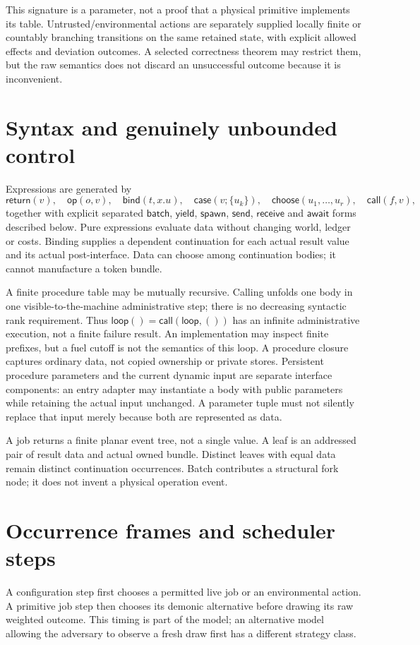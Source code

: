 \documentclass[11pt]{article}
\begin{document}
This signature is a parameter, not a proof that a physical primitive implements its table. Untrusted/environmental actions are separately supplied locally finite or countably branching transitions on the same retained state, with explicit allowed effects and deviation outcomes. A selected correctness theorem may restrict them, but the raw semantics does not discard an unsuccessful outcome because it is inconvenient.

\section{Syntax and genuinely unbounded control}
Expressions are generated by
\[
 \mathsf{return}(v),\quad\mathsf{op}(o,v),\quad
 \mathsf{bind}(t,x.u),\quad\mathsf{case}(v;\{u_k\}),\quad
 \mathsf{choose}(u_1,\ldots,u_r),\quad\mathsf{call}(f,v),
\]
together with explicit separated $\mathsf{batch}$, $\mathsf{yield}$, $\mathsf{spawn}$, $\mathsf{send}$, $\mathsf{receive}$ and $\mathsf{await}$ forms described below. Pure expressions evaluate data without changing world, ledger or costs. Binding supplies a dependent continuation for each actual result value and its actual post-interface. Data can choose among continuation bodies; it cannot manufacture a token bundle.

A finite procedure table may be mutually recursive. Calling unfolds one body in one visible-to-the-machine administrative step; there is no decreasing syntactic rank requirement. Thus $\mathsf{loop}()=\mathsf{call}(\mathsf{loop},())$ has an infinite administrative execution, not a finite failure result. An implementation may inspect finite prefixes, but a fuel cutoff is not the semantics of this loop. A procedure closure captures ordinary data, not copied ownership or private stores. Persistent procedure parameters and the current dynamic input are separate interface components: an entry adapter may instantiate a body with public parameters while retaining the actual input unchanged. A parameter tuple must not silently replace that input merely because both are represented as data.

A job returns a finite planar event tree, not a single value. A leaf is an addressed pair of result data and actual owned bundle. Distinct leaves with equal data remain distinct continuation occurrences. Batch contributes a structural fork node; it does not invent a physical operation event.

\section{Occurrence frames and scheduler steps}
A configuration step first chooses a permitted live job or an environmental action. A primitive job step then chooses its demonic alternative before drawing its raw weighted outcome. This timing is part of the model; an alternative model allowing the adversary to observe a fresh draw first has a different strategy class.
\end{document}

